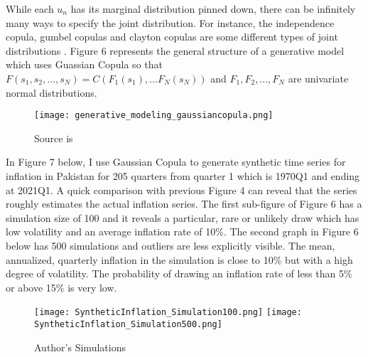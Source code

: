 \documentclass[12pt]{article}
\newcommand{\1}{\mathbbm 1}
\begin{document}
		While each $u_{n}$ has its marginal distribution pinned down, there can be infinitely many ways to specify the joint distribution. For instance, the independence copula, gumbel copulas and clayton copulas are some different types of joint distributions \cite{stachurski2016primer}. Figure 6 represents the general structure of a generative model which uses Guassian Copula so that $F(s_{1}, s_{2}, ..., s_{N}) = C(F_{1}(s_{1}), ... F_{N}(s_{N}))$ and $F_{1}, F_{2}, ... ,F_{N}$ are univariate normal distributions.
		
		
		
		
		
		
		
		
		
		
		
		
		
		
		
		
		
		\begin{figure}[H]
			\begin{Center}
				\texttt{[image: generative\_modeling\_gaussiancopula.png]}
				\caption{Source is  \cite{patki2016synthetic}}
			\end{Center}
		\end{figure}
		
		
		
		In Figure 7 below, I use Gaussian Copula to generate synthetic time series for inflation in Pakistan for 205 quarters from quarter 1 which is 1970Q1 and ending at 2021Q1. A quick comparison with previous Figure 4 can reveal that the series roughly estimates the actual inflation series. The first sub-figure of Figure 6 has a simulation size of 100 and it reveals a particular, rare or unlikely draw which has low volatility and an average inflation rate of 10\%. The second graph in Figure 6 below has 500 simulations and outliers are less explicitly visible. The mean, annualized, quarterly inflation in the simulation is close to 10\% but with a high degree of volatility. The probability of drawing an inflation rate of less than 5\% or above 15\% is very low.
		
		
		
		
		
		
		
		\begin{figure}[H]
			\begin{Center}
				\texttt{[image: SyntheticInflation\_Simulation100.png]}
				\texttt{[image: SyntheticInflation\_Simulation500.png]}
				\caption{Author's Simulations}
			\end{Center}
		\end{figure}
		
\end{document}
